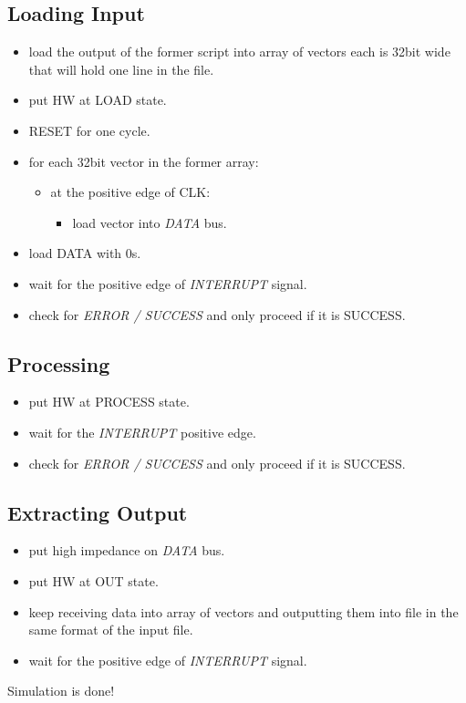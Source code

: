 \documentclass[12pt]{extarticle}
\begin{document}
\subsection{Loading Input}
\begin{itemize}
    \item load the output of the former script into array of vectors each is 32bit wide that will hold one line in the file.
    \item put HW at LOAD state.
    \item RESET for one cycle.
    \item for each 32bit vector in the former array:
    \begin{itemize}
        \item at the positive edge of CLK:
        \begin{itemize}
            \item load vector into \emph{DATA} bus.
        \end{itemize}
    \end{itemize}
    \item load DATA with 0s.
    \item wait for the positive edge of \emph{INTERRUPT} signal.
    \item check for \emph{ERROR / SUCCESS} and only proceed if it is SUCCESS.
\end{itemize}

\subsection{Processing}
\begin{itemize}
    \item put HW at PROCESS state.
    \item wait for the \emph{INTERRUPT} positive edge.
    \item check for \emph{ERROR / SUCCESS} and only proceed if it is SUCCESS.
\end{itemize}

\subsection{Extracting Output}
\begin{itemize}
    \item put high impedance on \emph{DATA} bus.
    \item put HW at OUT state.
    \item keep receiving data into array of vectors and outputting them into file in the same format of the input file.
    \item wait for the positive edge of \emph{INTERRUPT} signal. 
\end{itemize}
Simulation is done! 
\end{document}
